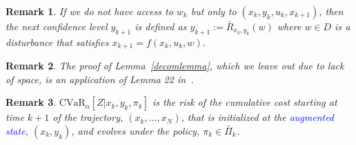 \documentclass[letterpaper, 10 pt, conference]{ieeeconf}  %
\newtheorem{remark}{Remark}
\begin{document}
%
\begin{remark}
If we do not have access to $w_k$ but only to $(x_k, y_k, u_k, x_{k+1})$, then the next confidence level $y_{k+1}$ is defined as $y_{k+1} := \bar{R}_{x_k, y_k}(w)$ where $w \in D$ is a disturbance that satisfies $x_{k+1} = f(x_k, u_k, w)$.
\end{remark}
%
\begin{remark}
The proof of Lemma~\ref{decomlemma}, which we leave out due to lack of space, is an application of Lemma 22 in~\cite{pflug2016time}. 
\end{remark}
%
\begin{remark}
$\text{CVaR}_\alpha [ Z | x_k, y_k, \pi_k ]$ is the risk of 
the cumulative cost starting at time $k+1$ of the trajectory, $(x_k, \dots, x_N)$, that is initialized at the \textcolor{blue}{augmented state}, $(x_k, y_k)$, 
and evolves under the policy, $\pi_k \in \bar{\Pi}_k$.
\end{remark}
\end{document}
